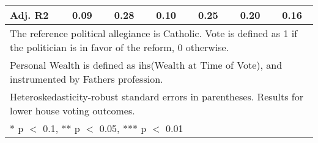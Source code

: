 \begin{table}
\begin{tabular}[t]{lcccccc}
Adj. R2 & \num{0.09} & \num{0.28} & \num{0.10} & \num{0.25} & \num{0.20} & \num{0.16}\\
\bottomrule
\multicolumn{7}{l}{\rule{0pt}{1em}The reference political allegiance is Catholic. Vote is defined as 1 if the politician is in favor of the reform, 0 otherwise.}\\
\multicolumn{7}{l}{\rule{0pt}{1em}Personal Wealth is defined as ihs(Wealth at Time of Vote), and instrumented by Fathers profession.}\\
\multicolumn{7}{l}{\rule{0pt}{1em}Heteroskedasticity-robust standard errors in parentheses. Results for lower house voting outcomes.}\\
\multicolumn{7}{l}{\rule{0pt}{1em}* p $<$ 0.1, ** p $<$ 0.05, *** p $<$ 0.01}\\
\end{tabular}
\end{table}
